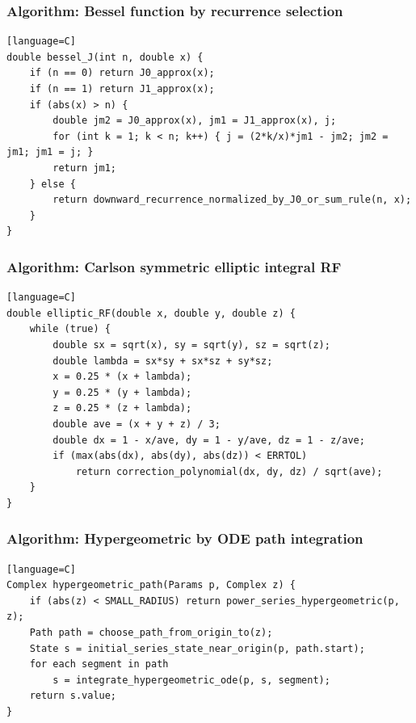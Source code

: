 \documentclass[11pt]{article}
\begin{document}
\subsubsection{Algorithm: Bessel function by recurrence selection}\label{algorithm-bessel-function-by-recurrence-selection}

\begin{verbatim}[language=C]
double bessel_J(int n, double x) {
    if (n == 0) return J0_approx(x);
    if (n == 1) return J1_approx(x);
    if (abs(x) > n) {
        double jm2 = J0_approx(x), jm1 = J1_approx(x), j;
        for (int k = 1; k < n; k++) { j = (2*k/x)*jm1 - jm2; jm2 = jm1; jm1 = j; }
        return jm1;
    } else {
        return downward_recurrence_normalized_by_J0_or_sum_rule(n, x);
    }
}
\end{verbatim}

\subsubsection{Algorithm: Carlson symmetric elliptic integral RF}\label{algorithm-carlson-symmetric-elliptic-integral-rf}

\begin{verbatim}[language=C]
double elliptic_RF(double x, double y, double z) {
    while (true) {
        double sx = sqrt(x), sy = sqrt(y), sz = sqrt(z);
        double lambda = sx*sy + sx*sz + sy*sz;
        x = 0.25 * (x + lambda);
        y = 0.25 * (y + lambda);
        z = 0.25 * (z + lambda);
        double ave = (x + y + z) / 3;
        double dx = 1 - x/ave, dy = 1 - y/ave, dz = 1 - z/ave;
        if (max(abs(dx), abs(dy), abs(dz)) < ERRTOL)
            return correction_polynomial(dx, dy, dz) / sqrt(ave);
    }
}
\end{verbatim}

\subsubsection{Algorithm: Hypergeometric by ODE path integration}\label{algorithm-hypergeometric-by-ode-path-integration}

\begin{verbatim}[language=C]
Complex hypergeometric_path(Params p, Complex z) {
    if (abs(z) < SMALL_RADIUS) return power_series_hypergeometric(p, z);
    Path path = choose_path_from_origin_to(z);
    State s = initial_series_state_near_origin(p, path.start);
    for each segment in path
        s = integrate_hypergeometric_ode(p, s, segment);
    return s.value;
}
\end{verbatim}
\end{document}
